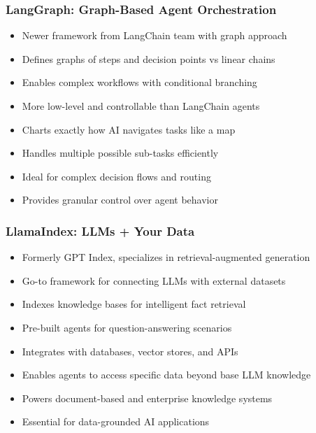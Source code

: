 \begin{frame}[fragile]\frametitle{LangGraph: Graph-Based Agent Orchestration}
      \begin{itemize}
	  \item Newer framework from LangChain team with graph approach
	  \item Defines graphs of steps and decision points vs linear chains
	  \item Enables complex workflows with conditional branching
	  \item More low-level and controllable than LangChain agents
	  \item Charts exactly how AI navigates tasks like a map
	  \item Handles multiple possible sub-tasks efficiently
	  \item Ideal for complex decision flows and routing
	  \item Provides granular control over agent behavior
	  \end{itemize}
\end{frame}

\begin{frame}[fragile]\frametitle{LlamaIndex: LLMs + Your Data}
      \begin{itemize}
	  \item Formerly GPT Index, specializes in retrieval-augmented generation
	  \item Go-to framework for connecting LLMs with external datasets
	  \item Indexes knowledge bases for intelligent fact retrieval
	  \item Pre-built agents for question-answering scenarios
	  \item Integrates with databases, vector stores, and APIs
	  \item Enables agents to access specific data beyond base LLM knowledge
	  \item Powers document-based and enterprise knowledge systems
	  \item Essential for data-grounded AI applications
	  \end{itemize}
\end{frame}

